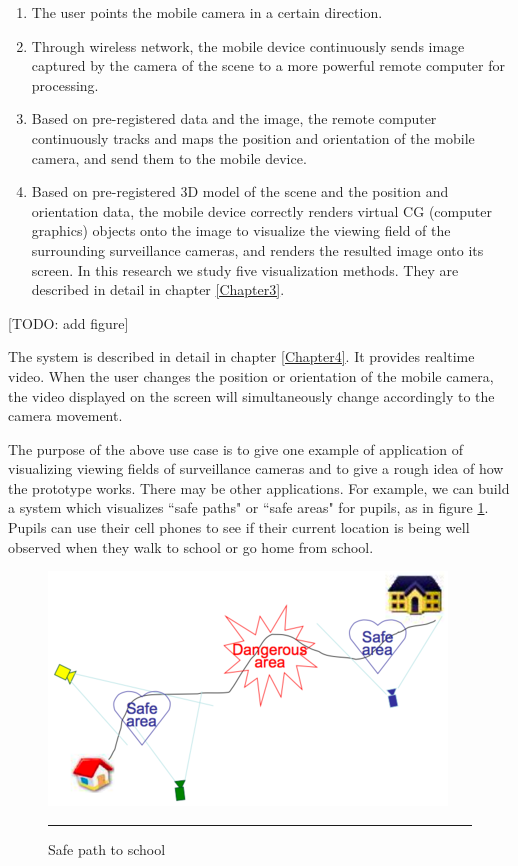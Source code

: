 \begin{enumerate}
	\item The user points the mobile camera in a certain direction.
	\item Through wireless network, the mobile device continuously sends image captured by the camera of the scene to a more powerful remote computer for processing.
	\item Based on pre-registered data and the image, the remote computer continuously tracks and maps the position and orientation of the mobile camera, and send them to the mobile device.
	\item Based on pre-registered 3D model of the scene and the position and orientation data, the mobile device correctly renders virtual CG (computer graphics) objects onto the image to visualize the viewing field of the surrounding surveillance cameras, and renders the resulted image onto its screen. In this research we study five visualization methods. They are described in detail in chapter \ref{Chapter3}.
\end{enumerate}

[TODO: add figure]

The system is described in detail in chapter \ref{Chapter4}. It provides realtime video. When the user changes the position or orientation of the mobile camera, the video displayed on the screen will simultaneously change accordingly to the camera movement.

The purpose of the above use case is to give one example of application of visualizing viewing fields of surveillance cameras and to give a rough idea of how the prototype works. There may be other applications. For example, we can build a system which visualizes ``safe paths" or ``safe areas" for pupils, as in figure \ref{fig:HomeSchool}. Pupils can use their cell phones to see if their current location is being well observed when they walk to school or go home from school.

\begin{figure}[htbp]
	\centering
	\includegraphics{./Primitives/home_school.png}
	\rule{35em}{0.5pt}
	\caption[Safe path to school]{Safe path to school}
	\label{fig:HomeSchool}
\end{figure}
